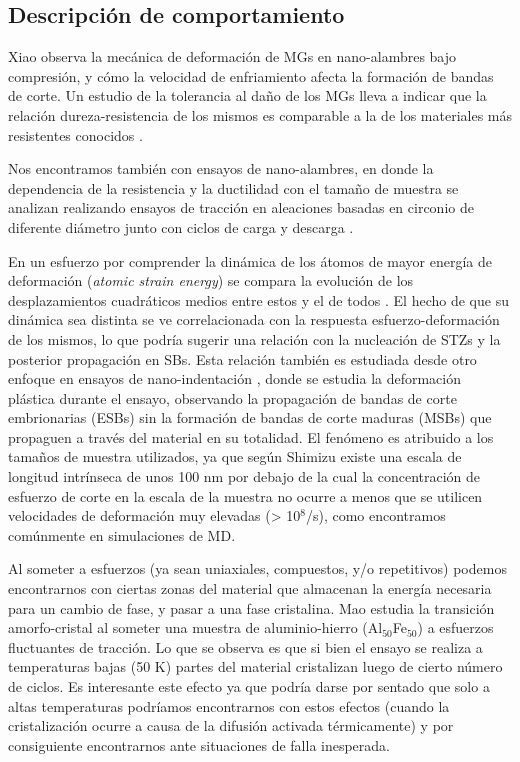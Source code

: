 \subsection{Descripción de comportamiento}
\label{S1_2_2}

Xiao \citep{xiao12} observa la mecánica de deformación de MGs en nano-alambres bajo compresión, y cómo la velocidad de enfriamiento afecta la formación de bandas de corte. Un estudio de la tolerancia al daño de los MGs lleva a indicar que la relación dureza-resistencia de los mismos es comparable a la de los materiales más resistentes conocidos \citep{Demetriou11}.

Nos encontramos también con ensayos de nano-alambres, en donde la dependencia de la resistencia y la ductilidad con el tamaño de muestra se analizan realizando ensayos de tracción en aleaciones basadas en circonio de diferente diámetro junto con ciclos de carga y descarga \citep{Dongchan10}.

En un esfuerzo por comprender la dinámica de los átomos de mayor energía de deformación (\textit{atomic strain energy}) se compara la evolución de los desplazamientos cuadráticos medios entre estos y el de todos \citep{tang15}. El hecho de que su dinámica sea distinta se ve correlacionada con la respuesta esfuerzo-deformación de los mismos, lo que podría sugerir una relación con la nucleación de STZs y la posterior propagación en SBs. Esta relación también es estudiada desde otro enfoque en ensayos de nano-indentación \citep{gu15}, donde se estudia la deformación plástica durante el ensayo, observando la propagación de bandas de corte embrionarias (ESBs) sin la formación de bandas de corte maduras (MSBs) que propaguen a través del material en su totalidad. El fenómeno es atribuido a los tamaños de muestra utilizados, ya que según Shimizu \citep{shimizu06} existe una escala de longitud intrínseca de unos 100 nm por debajo de la cual la concentración de esfuerzo de corte en la escala de la muestra no ocurre a menos que se utilicen velocidades de deformación muy elevadas (> 10$^{8}$/s), como encontramos comúnmente en simulaciones de MD.

Al someter a esfuerzos (ya sean uniaxiales, compuestos, y/o repetitivos) podemos encontrarnos con ciertas zonas del material que almacenan la energía necesaria para un cambio de fase, y pasar a una fase cristalina. Mao \citep{ma15} estudia la transición amorfo-cristal al someter una muestra de aluminio-hierro (Al$_{50}$Fe$_{50}$) a esfuerzos fluctuantes de tracción. Lo que se observa es que si bien el ensayo se realiza a temperaturas bajas (50 K) partes del material cristalizan luego de cierto número de ciclos. Es interesante este efecto ya que podría darse por sentado que solo a altas temperaturas podríamos encontrarnos con estos efectos (cuando la cristalización ocurre a causa de la difusión activada térmicamente) y por consiguiente encontrarnos ante situaciones de falla inesperada.

